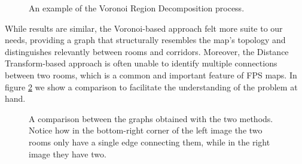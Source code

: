 \documentclass{Configuration_Files/PoliMi3i_thesis}
\begin{document}
\begin{figure}[H]
    \qquad
    
    \caption[Voronoi Region Decomposition example]{An example of the Voronoi Region Decomposition process.}
    \label{fig:voronoi_region_decomposition}
\end{figure}

While results are similar, the Voronoi-based approach felt more suite to our needs, providing a graph that structurally resembles the map's topology and distinguishes relevantly between rooms and corridors. Moreover, the Distance Transform-based approach is often unable to identify multiple connections between two rooms, which is a common and important feature of FPS maps. In figure \ref{fig:graph_comparison} we show a comparison to facilitate the understanding of the problem at hand.

\begin{figure}[H]
    \centering
    \qquad
    \caption[Graph comparison]{A comparison between the graphs obtained with the two methods. Notice how in the bottom-right corner of the left image the two rooms only have a single edge connecting them, while in the right image they have two.}
    \label{fig:graph_comparison}
\end{figure}
\end{document}
